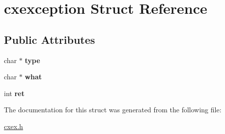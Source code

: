\hypertarget{a00048}{}\section{cxexception Struct Reference}
\label{a00048}
\subsection*{Public Attributes}
\begin{DoxyCompactItemize}
\item 
\mbox{\label{a00048_a21a3264050c2a040698bc6f37487c633}} 
char $\ast$ {\bfseries type}
\item 
\mbox{\label{a00048_a81aa35ab48089d35437efb5351ec2243}} 
char $\ast$ {\bfseries what}
\item 
\mbox{\label{a00048_a58947b8f85613c5c0db0a78adc2035d1}} 
int {\bfseries ret}
\end{DoxyCompactItemize}


The documentation for this struct was generated from the following file\+:\begin{DoxyCompactItemize}
\item 
\hyperlink{a00011}{cxex.\+h}\end{DoxyCompactItemize}
